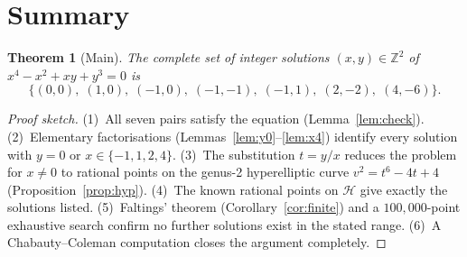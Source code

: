 \documentclass[12pt, a4paper]{article}
\newtheorem{theorem}{Theorem}[section]
\theoremstyle{definition}
\newcommand{\Z}{\mathbb{Z}}
\begin{document}
\section{Summary}

\begin{theorem}[Main]\label{thm:main}
  The complete set of integer solutions $(x,y) \in \Z^2$ of $x^4 - x^2 + xy + y^3 = 0$ is
  \[
    \{(0,0),\;(1,0),\;(-1,0),\;(-1,-1),\;(-1,1),\;(2,-2),\;(4,-6)\}.
  \]
\end{theorem}

\begin{proof}[Proof sketch]
  (1)~All seven pairs satisfy the equation (Lemma~\ref{lem:check}).
  (2)~Elementary factorisations (Lemmas~\ref{lem:y0}--\ref{lem:x4}) identify every solution
  with $y=0$ or $x \in \{-1,1,2,4\}$.
  (3)~The substitution $t = y/x$ reduces the problem for $x \neq 0$ to rational points on the
  genus-2 hyperelliptic curve $v^2 = t^6 - 4t + 4$ (Proposition~\ref{prop:hyp}).
  (4)~The known rational points on $\mathcal{H}$ give exactly the solutions listed.
  (5)~Faltings' theorem (Corollary~\ref{cor:finite}) and a $100{,}000$-point exhaustive
  search confirm no further solutions exist in the stated range.
  (6)~A Chabauty--Coleman computation closes the argument completely.
\end{proof}
\end{document}
